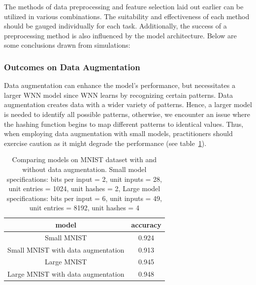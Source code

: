 \documentclass{article}[12pt]
\begin{document}
The methods of data preprocessing and feature selection laid out earlier can be utilized in various combinations.
The suitability and effectiveness of each method should be gauged individually for each task.
Additionally, the success of a preprocessing method is also influenced by the model architecture.
Below are some conclusions drawn from simulations:

\subsubsection{Outcomes on Data Augmentation}
Data augmentation can enhance the model's performance, but necessitates a larger WNN model since WNN learns by recognizing certain patterns.
Data augmentation creates data with a wider variety of patterns.
Hence, a larger model is needed to identify all possible patterns, otherwise, we encounter an issue where the hashing function begins to map different patterns to identical values.
Thus, when employing data augmentation with small models, practitioners should exercise caution as it might degrade the performance (see table~\ref{tab:table-1}).
\begin{table}[h]
    \centering
    \begin{tabular}{|c|c|}
    \hline
    model & accuracy \\
    \hline
       Small MNIST &  0.924\\
    \hline
       Small MNIST with data augmentation  & 0.913\\
    \hline
       Large MNIST &  0.945\\
    \hline
       Large MNIST with data augmentation  & 0.948\\
    \hline
    \end{tabular}
    \caption{Comparing models on MNIST dataset with and without data augmentation. Small model specifications: bits per input = 2, unit inputs = 28, unit entries = 1024, unit hashes = 2, Large model specifications: bits per input = 6, unit inputs = 49, unit entries = 8192, unit hashes = 4}
    \label{tab:table-1}
\end{table}
\end{document}
